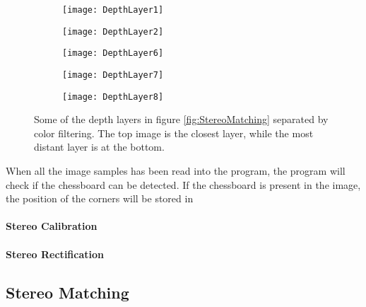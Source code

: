 \begin{wrapfigure}{R}{0.4\textwidth}
\centering

	\begin{subfigure}[b]{0.35\textwidth}
        \texttt{[image: DepthLayer1]}
	\end{subfigure}
	\par\medskip
	\begin{subfigure}[b]{0.35\textwidth}
        \texttt{[image: DepthLayer2]}
	\end{subfigure}
	\par\medskip
	\begin{subfigure}[b]{0.35\textwidth}
        \texttt{[image: DepthLayer6]}
	\end{subfigure}
	\par\medskip
	\begin{subfigure}[b]{0.35\textwidth}
        \texttt{[image: DepthLayer7]}
	\end{subfigure}
	\par\medskip
	\begin{subfigure}[b]{0.35\textwidth}
        \texttt{[image: DepthLayer8]}
	\end{subfigure}
	
\caption{Some of the depth layers in figure \ref{fig:StereoMatching} separated by color filtering. The top image is the closest layer, while the most distant layer is at the bottom.}
\label{fig:layers2}
\end{wrapfigure}

When all the image samples has been read into the program, the program will check if the chessboard can be detected. If the chessboard is present in the image, the position of the corners will be stored in  

\paragraph{Stereo Calibration}

\paragraph{Stereo Rectification}


\subsection{Stereo Matching}


